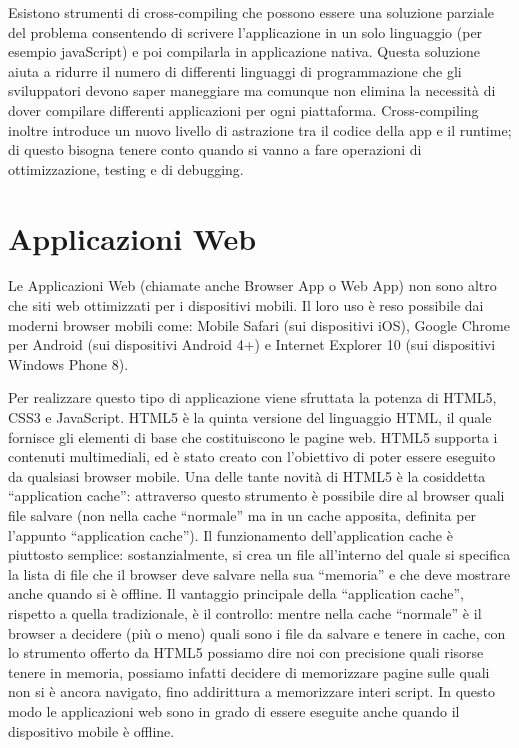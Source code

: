         Esistono strumenti di cross-compiling che possono essere una soluzione
        parziale del problema consentendo di scrivere l'applicazione in un solo
        linguaggio (per esempio javaScript) e poi compilarla in applicazione
        nativa. Questa soluzione aiuta a ridurre il numero di differenti
        linguaggi di programmazione che gli sviluppatori devono saper maneggiare
        ma comunque non elimina la necessità di dover compilare differenti
        applicazioni per ogni piattaforma. Cross-compiling inoltre introduce un
        nuovo livello di astrazione tra il codice della app e il runtime; di
        questo bisogna tenere conto quando si vanno a fare operazioni di
        ottimizzazione, testing e di debugging.

    \section{Applicazioni Web}
    \label{sec:webapp}
        Le Applicazioni Web (chiamate anche Browser App o Web App) non sono
        altro che siti web ottimizzati per i dispositivi mobili. Il loro uso è
        reso possibile dai moderni browser mobili come: Mobile Safari (sui
        dispositivi iOS), Google Chrome per Android (sui dispositivi Android 4+)
        e Internet Explorer 10 (sui dispositivi Windows Phone 8).

        Per realizzare questo tipo di applicazione viene sfruttata la potenza di
        HTML5, CSS3 e JavaScript. HTML5 è la quinta versione del linguaggio
        HTML, il quale fornisce gli elementi di base che costituiscono le pagine
        web. HTML5 supporta i contenuti multimediali, ed è stato creato con
        l'obiettivo di poter essere eseguito da qualsiasi browser
        mobile\citep{White:Native-vs-Html}. Una delle tante novità di HTML5 è la
        cosiddetta ``application cache'': attraverso questo strumento è
        possibile dire al browser quali file salvare (non nella cache
        ``normale'' ma in un cache apposita, definita per l'appunto
        ``application cache''). Il funzionamento dell'application cache è
        piuttosto semplice: sostanzialmente, si crea un file all'interno del
        quale si specifica la lista di file che il browser deve salvare nella
        sua ``memoria'' e che deve mostrare anche quando si è offline. Il
        vantaggio principale della ``application cache'', rispetto a quella
        tradizionale, è il controllo: mentre nella cache ``normale'' è il
        browser a decidere (più o meno) quali sono i file da salvare e tenere in
        cache, con lo strumento offerto da HTML5 possiamo dire noi con
        precisione quali risorse tenere in memoria, possiamo infatti decidere di
        memorizzare pagine sulle quali non si è ancora navigato, fino
        addirittura a memorizzare interi script. In questo modo le applicazioni
        web sono in grado di essere eseguite anche quando il dispositivo mobile
        è offline.

